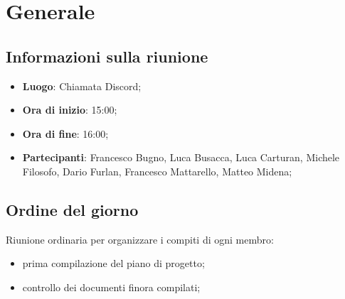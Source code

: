 \section{Generale}

\vspace{10pt}


\subsection{Informazioni sulla riunione}
\begin{itemize}
	\item \textbf{Luogo}: Chiamata Discord;
	\item \textbf{Ora di inizio}: 15:00;
	\item \textbf{Ora di fine}: 16:00;
	\item \textbf{Partecipanti}: Francesco Bugno, Luca Busacca, Luca Carturan, Michele
	Filosofo, Dario Furlan, Francesco Mattarello, Matteo Midena;
\end{itemize}

\vspace{5pt}

\subsection{Ordine del giorno}
Riunione ordinaria per organizzare i compiti di ogni membro:
\begin{itemize}
	\item prima compilazione del piano di progetto;
	\item controllo dei documenti finora compilati;
\end{itemize}
